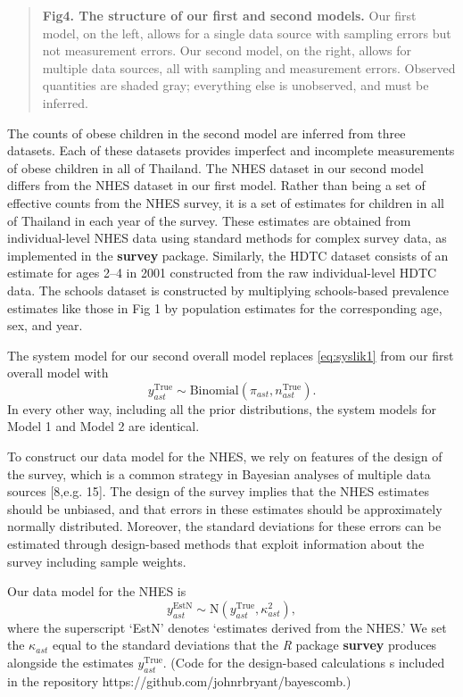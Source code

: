 \documentclass[10pt,letterpaper]{article}
\begin{document}
\begin{quote}
\textbf{Fig4. The structure of our first and second models.} Our first model, on the left, allows for a single data source with sampling errors but not measurement errors. Our second model, on the right, allows for multiple data sources, all with sampling and measurement errors. Observed quantities are shaded gray; everything else is unobserved, and must be inferred.
\end{quote}

The counts of obese children in the second model are inferred from three
datasets. Each of these datasets provides imperfect and incomplete
measurements of obese children in all of Thailand. The NHES dataset in
our second model differs from the NHES dataset in our first model.
Rather than being a set of effective counts from the NHES survey, it is
a set of estimates for children in all of Thailand in each year of the
survey. These estimates are obtained from individual-level NHES data
using standard methods for complex survey data, as implemented in the
\textbf{survey} package. Similarly, the HDTC dataset consists of an
estimate for ages 2--4 in 2001 constructed from the raw individual-level
HDTC data. The schools dataset is constructed by multiplying
schools-based prevalence estimates like those in Fig 1 by population
estimates for the corresponding age, sex, and year.

The system model for our second overall model replaces
\eqref{eq:syslik1} from our first overall model with \begin{equation}
  y_{ast}^{\text{True}} \sim \text{Binomial}(\pi_{ast}, n_{ast}^{\text{True}}). \label{eq:syslik2}
\end{equation} In every other way, including all the prior
distributions, the system models for Model 1 and Model 2 are identical.

To construct our data model for the NHES, we rely on features of the
design of the survey, which is a common strategy in Bayesian analyses of
multiple data sources {[}8,e.g. 15{]}. The design of the survey implies
that the NHES estimates should be unbiased, and that errors in these
estimates should be approximately normally distributed. Moreover, the
standard deviations for these errors can be estimated through
design-based methods that exploit information about the survey including
sample weights.

Our data model for the NHES is \begin{equation}
  y_{ast}^{\text{EstN}} \sim \text{N}(y_{ast}^{\text{True}}, \kappa_{ast}^2), \label{eq:datamodnhes}
\end{equation} where the superscript `EstN' denotes `estimates derived
from the NHES.' We set the \(\kappa_{ast}\) equal to the standard
deviations that the \emph{R} package \textbf{survey} produces alongside
the estimates \(y_{ast}^{\text{True}}\). (Code for the design-based
calculations s included in the repository
https://github.com/johnrbryant/bayescomb.)
\end{document}

